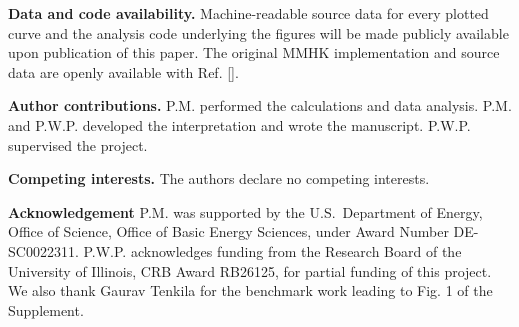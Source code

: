 \documentclass[aps,prl,reprint,superscriptaddress,nofootinbib,longbibliography]{revtex4-1}
\newcommand{\refdisp}[1]{Ref. [\onlinecite{#1}]}
\begin{document}
\textbf{Data and code availability.} Machine-readable source data for every plotted curve and the analysis code underlying the figures will be made publicly available upon publication of this paper. The original MMHK implementation and source data are openly available with \refdisp{mai2026twisting}.

\textbf{Author contributions.} P.M. performed the calculations and data analysis.  P.M. and P.W.P. developed the interpretation and wrote the manuscript. P.W.P. supervised the project.

\textbf{Competing interests.} The authors declare no competing interests.

\textbf{Acknowledgement} P.M. was supported by the U.S.~Department of Energy, Office of Science, Office of Basic Energy Sciences, under Award Number DE-SC0022311. P.W.P. acknowledges funding from the Research Board of the University of Illinois, CRB Award RB26125, for partial funding of this project.  We also thank Gaurav Tenkila for the benchmark work leading to Fig. 1 of the Supplement.  



\end{document}
